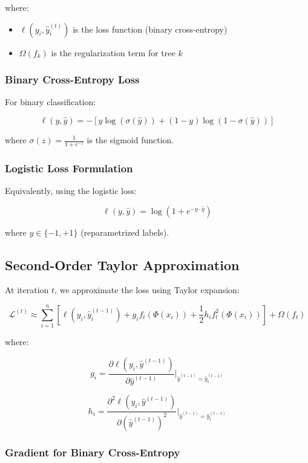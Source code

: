 \documentclass[12pt,a4paper]{article}
\begin{document}
where:
\begin{itemize}
    \item $\ell(y_i, \hat{y}_i^{(t)})$ is the loss function (binary cross-entropy)
    \item $\Omega(f_k)$ is the regularization term for tree $k$
\end{itemize}

\subsubsection{Binary Cross-Entropy Loss}

For binary classification:

$$\ell(y, \hat{y}) = -[y \log(\sigma(\hat{y})) + (1-y) \log(1 - \sigma(\hat{y}))]$$

where $\sigma(z) = \frac{1}{1 + e^{-z}}$ is the sigmoid function.

\subsubsection{Logistic Loss Formulation}

Equivalently, using the logistic loss:

$$\ell(y, \hat{y}) = \log(1 + e^{-y \cdot \hat{y}})$$

where $y \in \{-1, +1\}$ (reparametrized labels).

\subsection{Second-Order Taylor Approximation}

At iteration $t$, we approximate the loss using Taylor expansion:

$$\mathcal{L}^{(t)} \approx \sum_{i=1}^{n} [\ell(y_i, \hat{y}_i^{(t-1)}) + g_i f_t(\Phi(x_i)) + \frac{1}{2} h_i f_t^2(\Phi(x_i))] + \Omega(f_t)$$

where:

$$g_i = \frac{\partial \ell(y_i, \hat{y}^{(t-1)})}{\partial \hat{y}^{(t-1)}} \bigg|_{\hat{y}^{(t-1)} = \hat{y}_i^{(t-1)}}$$

$$h_i = \frac{\partial^2 \ell(y_i, \hat{y}^{(t-1)})}{\partial (\hat{y}^{(t-1)})^2} \bigg|_{\hat{y}^{(t-1)} = \hat{y}_i^{(t-1)}}$$

\subsubsection{Gradient for Binary Cross-Entropy}
\end{document}
